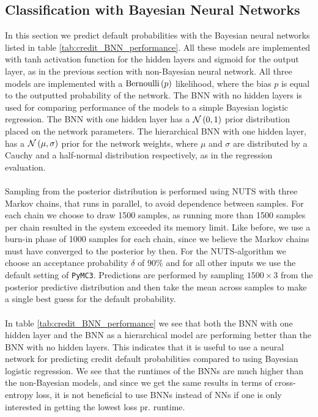 \subsection{Classification with Bayesian Neural Networks}
In this section we predict default probabilities with the Bayesian neural networks listed in table \ref{tab:credit_BNN_performance}. All these models are implemented with tanh activation function for the hidden layers and sigmoid for the output layer, as in the previous section with non-Bayesian neural network. All three models are implemented with a $\operatorname{Bernoulli}\left (p\right)$ likelihood, where the bias $p$ is equal to the outputted probability of the network. The BNN with no hidden layers is used for comparing performance of the models to a simple Bayesian logistic regression. The BNN with one hidden layer has a $\mathcal{N}\left (0,1\right)$ prior distribution placed on the network parameters. The hierarchical BNN with one hidden layer, has a $\mathcal{N}\left (\mu,\sigma\right)$ prior for the network weights, where $\mu$ and $\sigma$ are distributed by a Cauchy and a half-normal distribution respectively, as in the regression evaluation. \\
\\
Sampling from the posterior distribution is performed using NUTS with three Markov chains, that runs in parallel, to avoid dependence between samples. For each chain we choose to draw 1500 samples, as running more than 1500 samples per chain resulted in the system exceeded its memory limit. Like before, we use a burn-in phase of 1000 samples for each chain, since we believe the Markov chains must have converged to the posterior by then. For the NUTS-algorithm we choose an
acceptance probability $\delta$ of $90\%$ and for all other inputs we use the default setting of \texttt{PyMC3}. Predictions are performed by sampling $1500 \times 3$ from the posterior predictive distribution and then take the mean across samples to make a single best guess for the default probability. \\
\\
In table \ref{tab:credit_BNN_performance} we see that both the BNN with one hidden layer and the BNN as a hierarchical model are performing better than the BNN with no hidden layers. This indicates that it is useful to use a neural network for predicting credit default probabilities compared to using Bayesian logistic regression. We see that the runtimes of the BNNs are much higher than the non-Bayesian models, and since we get the same results in terms of cross-entropy loss, it is not beneficial to use BNNs instead of NNs if one is only interested in getting the lowest loss pr. runtime.  \\

